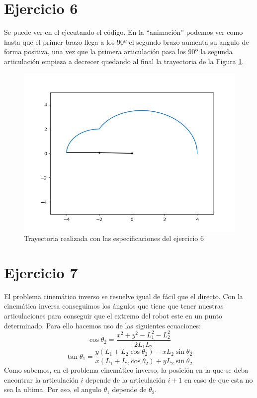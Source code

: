 \documentclass[12pt,a4paper]{report}
\begin{document}
\section*{Ejercicio 6}
Se puede ver en el ejecutando el código. En la ``animación'' podemos ver como hasta que el primer brazo llega a los $90º$ el segundo brazo aumenta su angulo de forma positiva, una vez que la primera articulación pasa los $90º$ la segunda articulación empieza a decrecer quedando al final la trayectoria de la Figura \ref{fig:ej6}.
\begin{figure}[H]
	\centering
	\includegraphics[width=0.7\linewidth]{img/ej6}
	\caption{Trayectoria realizada con las especificaciones del ejercicio 6}
	\label{fig:ej6}
\end{figure}
\section*{Ejercicio  7}
El problema cinemático inverso se resuelve igual de fácil que el directo. Con la cinemática inversa conseguimos los ángulos que tiene que tener nuestras articulaciones para conseguir que el extremo del robot este en un punto determinado.  Para ello hacemos uso de las siguientes ecuaciones:
$$ \cos\theta_2 = \frac{x^2+y^2-L_1^2 -L_2^2}{2L_1 L_2}$$
$$ \tan\theta_1 = \frac{y(L_1 + L_2\cos\theta_2)-xL_2\sin\theta_2}{x(L_1 + L_2\cos\theta_2)+yL_2\sin\theta_2}$$
Como sabemos, en el problema cinemático inverso, la posición en la que se deba encontrar la articulación $i$ depende de la articulación $i+1$ en caso de que esta no sea la ultima. Por eso, el angulo $\theta_1$ depende de $\theta_2$.
\end{document}
